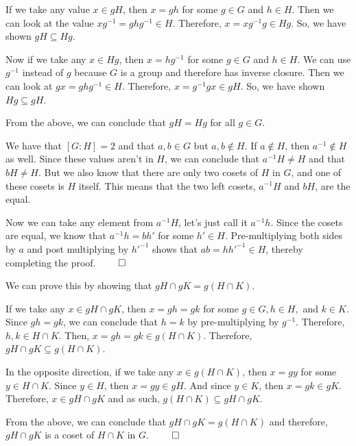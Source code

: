 \documentclass[12pt]{report}
\begin{document}
\sol If we take any value $x \in gH$, then $x = gh$ for some $g \in G$ and $h \in H$. Then we can look at the value $xg^{-1} = ghg^{-1} \in H$. Therefore, $x = xg^{-1}g \in Hg$. So, we have shown $gH \subseteq Hg$.

Now if we take any $x \in Hg$, then $x = hg^{-1}$ for some $g \in G$ and $h \in H$. We can use $g^{-1}$ instead of $g$ because $G$ is a group and therefore has inverse closure. Then we can look at $gx = ghg^{-1} \in H$. Therefore, $x = g^{-1}gx \in gH$. So, we have shown $Hg \subseteq gH$.

From the above, we can conclude that $gH = Hg$ for all $g \in G$. 

\sol We have that $[G : H] = 2$ and that $a,b \in G$ but $a,b \not \in H$. If $a \not\in H$, then $a^{-1} \not\in H$ as well. Since these values aren't in $H$, we can conclude that $a^{-1}H \neq H$ and that $bH \neq H$. But we also know that there are only two cosets of $H$ in $G$, and one of these cosets is $H$ itself. This means that the two left cosets, $a^{-1}H$ and $bH$, are the equal. 

Now we can take any element from $a^{-1}H$, let's just call it $a^{-1}h$. Since the cosets are equal, we know that $a^{-1}h = bh'$ for some $h' \in H$. Pre-multiplying both sides by $a$ and post multiplying by $h'^{-1}$ shows that $ab = hh'^{-1} \in H$, thereby completing the proof. $\qed$

\sol We can prove this by showing that $gH \cap gK = g(H \cap K)$. 

If we take any $x \in gH \cap gK$, then $x = gh = gk$ for some $g\in G, h \in H,$ and $k\in K$. Since $gh = gk$, we can conclude that $h = k$ by pre-multiplying by $g^{-1}$. Therefore, $h,k \in H \cap K$. Then, $x = gh = gk \in g(H \cap K)$. Therefore, $gH \cap gK \subseteq g(H \cap K)$.

In the opposite direction, if we take any $x \in g(H\cap K)$, then $x = gy$ for some $y \in H \cap K$. Since $y \in H$, then $x = gy \in gH$. And since $ y \in K$, then $x = gk \in gK$. Therefore, $x \in gH \cap gK$ and as such, $g(H \cap K) \subseteq gH \cap gK$.

From the above, we can conclude that $gH \cap gK = g(H \cap K)$ and therefore, $gH \cap gK$ is a coset of $H \cap K$ in $G$. $\qed$
\end{document}

